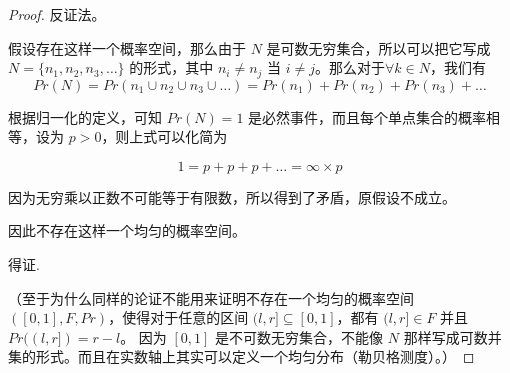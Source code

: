 \documentclass[12pt, a4paper, oneside]{ctexart}
\begin{document}
\begin{problem}

\end{problem}
\begin{proof}
  反证法。

  假设存在这样一个概率空间，那么由于 $N$ 是可数无穷集合，所以可以把它写成 $N = \{n_1, n_2, n_3, …\}$ 的形式，其中 $n_i \neq n_j$ 当 $i \neq j$。那么对于$\forall k \in N$，我们有
  $$Pr (N) = Pr ({n_1} \cup {n_2} \cup {n_3} \cup …) = Pr ({n_1}) + Pr ({n_2}) + Pr ({n_3}) + …$$

  根据归一化的定义，可知 $Pr (N) = 1$ 是必然事件，而且每个单点集合的概率相等，设为 $p > 0$，则上式可以化简为

  $$1 = p + p + p + … = \infty \times p$$

  因为无穷乘以正数不可能等于有限数，所以得到了矛盾，原假设不成立。

  因此不存在这样一个均匀的概率空间。

  得证.


  （至于为什么同样的论证不能用来证明不存在一个均匀的概率空间 $([0, 1], F, Pr)$，使得对于任意的区间 $(l, r] \subseteq  [0, 1]$，都有 $(l, r] \in F$ 并且 $Pr ((l, r]) = r - l$。
  因为 $[0, 1]$ 是不可数无穷集合，不能像 $N$ 那样写成可数并集的形式。而且在实数轴上其实可以定义一个均匀分布（勒贝格测度）。）
\end{proof}
\begin{problem}

\end{problem}
\end{document}
